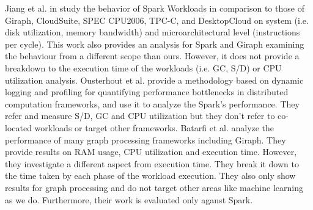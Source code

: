 Jiang et al. in \cite{inmem} study the behavior of Spark Workloads in comparison to those of Giraph, CloudSuite, SPEC CPU2006,
TPC-C, and DesktopCloud on system (i.e. disk utilization, memory bandwidth)  and microarchitectural level (instructions per cycle). This work
also provides an analysis for Spark and Giraph examining the behaviour from a different scope than ours. However, it does not provide a breakdown to the execution time of the workloads (i.e. GC, S/D) or CPU utilization analysis.
Ousterhout et al. \cite{makingsense} provide a methodology based on dynamic logging and profiling for quantifying performance bottlenecks in distributed computation frameworks, and use it to analyze the Spark’s performance. They refer and measure S/D, GC and CPU utilization but they don't refer to co-located workloads or target other frameworks. Batarfi et al. \cite{giraphgraphalytics} analyze the performance of many graph processing frameworks including Giraph. They provide results on RAM usage, CPU utilization and execution time. However, they investigate a different aspect from execution time. They break it down to the time taken by each phase of the workload execution.  They also only show results for graph processing and do not target other areas like machine learning as we do. Furthermore, their work is evaluated only aganst Spark. 

